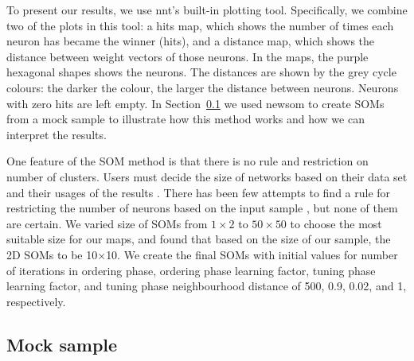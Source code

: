      To present our results, we use {\sc nnt}'s built-in plotting tool.
     Specifically, we combine two of the plots in this tool: a hits map, which shows the number of times each neuron has became the winner (hits), and a distance map, which shows the distance between weight vectors of those neurons.
     In the maps, the purple hexagonal shapes shows the neurons. 
     The distances are shown by the grey cycle colours: the darker the colour, the larger the distance between neurons.
     Neurons with zero hits are left empty.
     In Section~\ref{sec: mock_sample} we used {\sc newsom} to create SOMs from a mock sample to illustrate how this method works and how we can interpret the results.

     One feature of the SOM method is that there is no rule and restriction on number of clusters.
     Users must decide the size of networks based on their data set and their usages of the results .
     There has been few attempts to find a rule for restricting the number of neurons based on the input sample \citep[e.g.][]{Vesanto05}, but none of them are certain. 
     We varied size of SOMs from $1\times2$ to $50\times50$ to choose the most suitable size for our maps, and found that based on the size of our sample, the 2D SOMs to be 10$\times$10. 
     We create the final SOMs with initial values for number of iterations in ordering phase, ordering phase learning factor, tuning phase learning factor, and tuning phase neighbourhood distance of 500, 0.9, 0.02, and 1, respectively. 
     
    
\subsection{Mock sample}
\label{sec: mock_sample}
 
